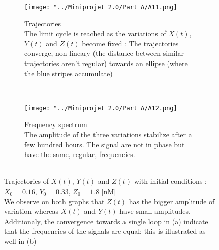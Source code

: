 \documentclass[10pt,a4paper,oneside,twocolumn]{article}
\numberwithin{equation}{section} %
\begin{document}
    \begin{figure}[!h]
	\begin{subfigure}[b]{0.5\textwidth}
	    \texttt{[image: "../Miniprojet 2.0/Part A/A11.png]}
	    \caption{Trajectories\\
	    The limit cycle is reached as the variations of $X(t)$, $Y(t)$ and $Z(t)$ become fixed : The trajectories converge, non-lineary (the distance between similar trajectories aren't regular) towards an ellipse (where the blue stripes accumulate)}
	\end{subfigure}
	~
	\begin{subfigure}[b]{0.5\textwidth}
	    \texttt{[image: "../Miniprojet 2.0/Part A/A12.png]}
	    \caption{Frequency spectrum \\
	    The amplitude of the three variations stabilize after a few hundred hours. The signal are not in phase but have the same, regular, frequencies.}
	\end{subfigure}
	\caption{\\Trajectories of $X(t)$, $Y(t)$ and $Z(t)$ with initial conditions : $X_0 = 0.16$, $Y_0 = 0.33 $, $Z_0 = 1.8$ [nM]\\ We observe on both graphs that $Z(t)$ has the bigger amplitude of variation whereas $X(t)$ and $Y(t)$ have small amplitudes. Additionaly, the convergence towards a single loop in (a) indicate that the frequencies of the signals are equal; this is illustrated as well in (b)
	}
    \end{figure}
\end{document}
